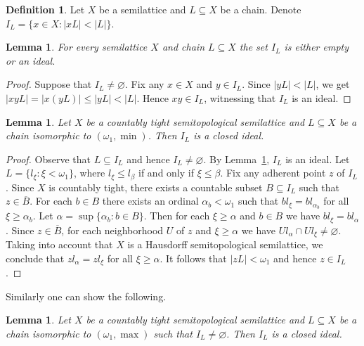 \documentclass[12pt, twoside, leqno]{article}
\newtheorem{lemma}[theorem]{Lemma}
\theoremstyle{definition}
\newtheorem{definition}[theorem]{Definition}
\numberwithin{equation}{section}
\newcommand{\w}{\omega}
\newcommand{\var}{\varnothing}
\begin{document}
\begin{definition}
Let $X$ be a semilattice and $L\subseteq X$ be a chain. Denote $I_L=\{x\in X: |xL|<|L|\}$.  
\end{definition}


\begin{lemma}\label{idealIL}
For every semilattice $X$ and chain $L\subseteq X$ the set $I_L$ is either empty or an ideal.   
\end{lemma}

\begin{proof}
Suppose that $I_L\neq \varnothing$. Fix any $x\in X$ and $y\in I_L$. Since $|yL|<|L|$, we get $|xyL|=|x(yL)|\leq |yL|<|L|$. Hence $xy\in I_L$, witnessing that $I_L$ is an ideal.    
\end{proof}

\begin{lemma}\label{IL}
Let $X$ be a countably tight semitopological semilattice and $L\subseteq X$ be a chain isomorphic to $(\w_1,\min)$. Then $I_L$ is a closed ideal.     
\end{lemma}

\begin{proof}
Observe that $L\subseteq I_L$ and hence $I_L\neq \var$. 
By Lemma~\ref{idealIL}, $I_L$ is an ideal.
Let $L=\{l_\xi:\xi < \w_1\}$, where $l_\xi\leq l_\beta$ if and only if $\xi\leq \beta$. Fix any adherent point $z$ of $I_L$. Since $X$ is countably tight, there exists a countable subset $B\subseteq I_L$ such that $z\in \overline{B}$.
For each $b\in B$ there exists an ordinal $\alpha_b<\w_1$ such that $b l_{\xi}=b l_{\alpha_b}$ for all $\xi\geq \alpha_b$. Let $\alpha=\sup\{\alpha_b:b\in B\}$. Then for each $\xi\geq \alpha$ and $b\in B$ we have $b l_{\xi}=b l_{\alpha}$. Since $z\in \overline{B}$, for each neighborhood $U$ of $z$ and $\xi\geq \alpha$ we have $Ul_\alpha\cap Ul_\xi\neq \varnothing$. Taking into account that $X$ is a Hausdorff semitopological semilattice, we conclude that $zl_\alpha=zl_\xi$ for all $\xi\geq \alpha$. It follows that $|zL|<\w_1$ and hence $z\in I_L$. 
\end{proof}

Similarly one can show the following.

\begin{lemma}\label{IL1}
Let $X$ be a countably tight semitopological semilattice and $L\subseteq X$ be a chain isomorphic to $(\w_1,\max)$ such that $I_L\neq \var$. Then $I_L$ is a closed ideal.    
\end{lemma}
\end{document}
